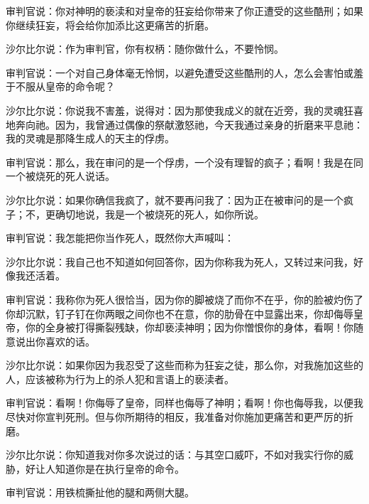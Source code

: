 审判官说：你对神明的亵渎和对皇帝的狂妄给你带来了你正遭受的这些酷刑；如果你继续狂妄，将会给你加添比这更痛苦的折磨。\par

沙尔比尔说：作为审判官，你有权柄：随你做什么，不要怜悯。\par

审判官说：一个对自己身体毫无怜悯，以避免遭受这些酷刑的人，怎么会害怕或羞于不服从皇帝的命令呢？\par

沙尔比尔说：你说我不害羞，说得对：因为那使我成义的就在近旁，我的灵魂狂喜地奔向祂。因为，我曾通过偶像的祭献激怒祂，今天我通过亲身的折磨来平息祂：我的灵魂是那降生成人的天主的俘虏。\par

审判官说：那么，我在审问的是一个俘虏，一个没有理智的疯子；看啊！我是在同一个被烧死的死人说话。\par

沙尔比尔说：如果你确信我疯了，就不要再问我了：因为正在被审问的是一个疯子；不，更确切地说，我是一个被烧死的死人，如你所说。\par

审判官说：我怎能把你当作死人，既然你大声喊叫：\par

沙尔比尔说：我自己也不知道如何回答你，因为你称我为死人，又转过来问我，好像我还活着。\par

审判官说：我称你为死人很恰当，因为你的脚被烧了而你不在乎，你的脸被灼伤了你却沉默，钉子钉在你两眼之间你也不在意，你的肋骨在中显露出来，你却侮辱皇帝，你的全身被打得撕裂残缺，你却亵渎神明；因为你憎恨你的身体，看啊！你随意说出你喜欢的话。\par

沙尔比尔说：如果你因为我忍受了这些而称为狂妄之徒，那么你，对我施加这些的人，应该被称为行为上的杀人犯和言语上的亵渎者。\par

审判官说：看啊！你侮辱了皇帝，同样也侮辱了神明；看啊！你也侮辱我，以便我尽快对你宣判死刑。但与你所期待的相反，我准备对你施加更痛苦和更严厉的折磨。\par

沙尔比尔说：你知道我对你多次说过的话：与其空口威吓，不如对我实行你的威胁，好让人知道你是在执行皇帝的命令。\par

审判官说：用铁梳撕扯他的腿和两侧大腿。\par

